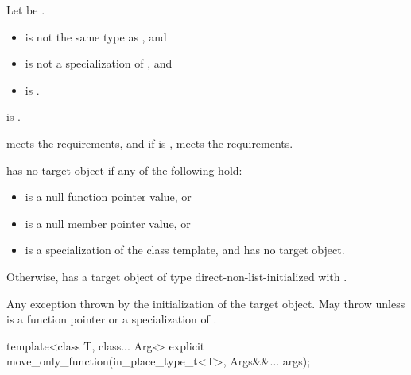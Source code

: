 \begin{itemdescr}
\pnum
Let  be .

\pnum
\constraints
\begin{itemize}
\item
{} is not the same type as , and
\item
{} is not a specialization of , and
\item
{} is .
\end{itemize}

\pnum
\mandates
{} is .

\pnum
\expects
{} meets the  requirements, and
if  is ,
 meets the  requirements.

\pnum
\ensures
{} has no target object if any of the following hold:
\begin{itemize}
\item
{} is a null function pointer value, or
\item
{} is a null member pointer value, or
\item
{} is a specialization of
the  class template,
and  has no target object.
\end{itemize}
Otherwise,  has a target object of type 
direct-non-list-initialized with .

\pnum
\throws
Any exception thrown by the initialization of the target object.
May throw  unless  is
a function pointer or a specialization of .
\end{itemdescr}

%
\begin{itemdecl}
template<class T, class... Args>
  explicit move_only_function(in_place_type_t<T>, Args&&... args);
\end{itemdecl}

